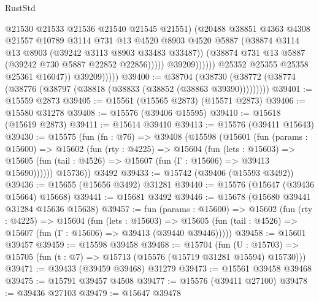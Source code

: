 \begin{lexlean}{RustStd}
\begin{coremodule}
                                    @21530
                                    @21533
                                    @21536
                                    @21540
                                    @21545
                                    @21551)
                                  (@20488
                                    @38851
                                    @4363
                                    @4308
                                    @21557
                                    @10789
                                    @3114
                                    @731
                                    @13
                                    @4520
                                    @8903
                                    @4520
                                    @5887
                                    (@38874 @3114 @13 @8903 (@39242 @3113 @8903 @33483 @33487))
                                    (@38874 @731 @13 @5887 (@39242 @730 @5887 @22852 @22856)))))
                              @39209))))))
                  @25352
                  @25355
                  @25358
                  @25361
                  @16047))
              @39209)))))
@39400 := @38704
    (@38730 (@38772 (@38774 (@38776 (@38797 (@38818 (@38833 (@38852 (@38863 @39390)))))))))
@39401 := @15559 @2873
@39405 := @15561 (@15565 @2873) (@15571 @2873)
@39406 := @15580 @31278
@39408 := @15576 (@39406 @15595)
@39410 := @15618 (@15619 @2873)
@39411 := @15614 @39410
@39413 := @15576 (@39411 @15643)
@39430 := @15575
    (fun (fn : @76) =>
    @39408
      (@15598
        (@15601
          (fun (params : @15600) =>
          @15602
            (fun (rty : @4225) =>
            @15604
              (fun (lets : @15603) =>
              @15605 (fun (tail : @4526) => @15607 (fun (Γ : @15606) => @39413 @15690))))))
        @15736))
    @3492
@39433 := @15742 (@39406 (@15593 @3492))
@39436 := @15655 (@15656 @3492) @31281
@39440 := @15576 (@15647 (@39436 @15664) @15668)
@39441 := @15681 @3492
@39446 := @15678 (@15680 @39441 @31284 @15636 @15638)
@39457 := fun (params : @15600) =>
  @15602
    (fun (rty : @4225) =>
    @15604
      (fun (lets : @15603) =>
      @15605 (fun (tail : @4526) => @15607 (fun (Γ : @15606) => @39413 (@39440 @39446)))))
@39458 := @15601 @39457
@39459 := @15598 @39458
@39468 := @15704
    (fun (U : @15703) => @15705 (fun (t : @7) => @15713 (@15576 (@15719 @31281 @15594) @15730)))
@39471 := @39433 (@39459 @39468) @31279
@39473 := @15561 @39458 @39468
@39475 := @15791 @39457 @4508
@39477 := @15576 (@39411 @27100)
@39478 := @39436 @27103
@39479 := @15647 @39478

\end{coremodule}
\end{lexlean}
